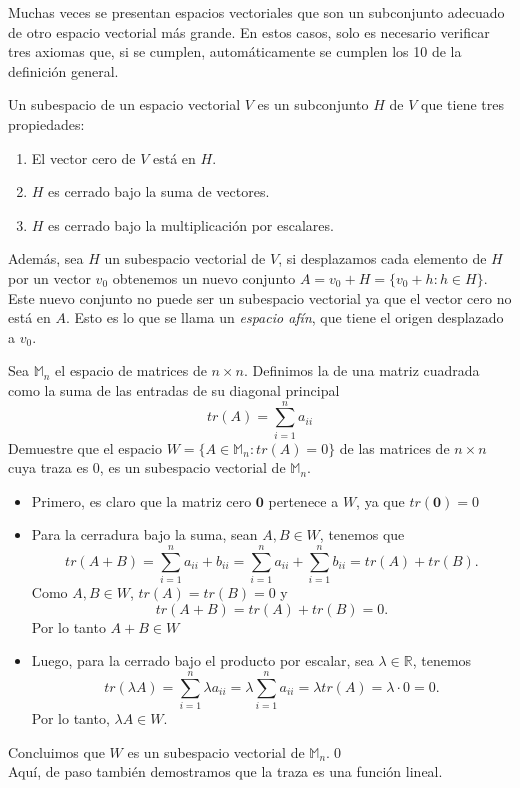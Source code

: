 \documentclass[12pt]{book}
\begin{document}
Muchas veces se presentan espacios vectoriales que son un subconjunto adecuado de otro espacio vectorial más grande. En estos casos, solo es necesario verificar tres axiomas que, si se cumplen, automáticamente se cumplen los 10 de la definición general.
\begin{definitionenv}
    Un subespacio de un espacio vectorial $V$ es un subconjunto $H$ de $V$ que tiene tres propiedades:
    \begin{enumerate}[label=\alph*)]
        \item El vector cero de $V$ está en $H$.
        \item $H$ es cerrado bajo la suma de vectores.
        \item $H$ es cerrado bajo la multiplicación por escalares.
    \end{enumerate}
\end{definitionenv}

Además, sea $H$ un subespacio vectorial de $V$, si desplazamos cada elemento de $H$ por un vector $v_0$ obtenemos un nuevo conjunto $A=v_0+H=\{v_0+h:h\in H\}$. Este nuevo conjunto no puede ser un subespacio vectorial ya que el vector cero no está en $A$. Esto es lo que se llama un \textit{espacio afín}, que tiene el origen desplazado a $v_0$.

\begin{exampleenv}
    Sea $\mathbb{M}_n$ el espacio de matrices de $n\times n$. Definimos la  de una matriz cuadrada como la suma de las entradas de su diagonal principal
    \[
    tr(A)=\sum_{i=1}^n a_{ii}
    \]
    Demuestre que el espacio $W=\{A\in \mathbb{M}_n: tr(A)=0\}$ de las matrices de $n\times n$ cuya traza es 0, es un subespacio vectorial de $\mathbb{M}_n$.

    \begin{itemize}
        \item Primero, es claro que la matriz cero $\mathbf{0}$ pertenece a $W$, ya que $tr(\mathbf{0})=0$
        \item Para la cerradura bajo la suma, sean $A,B\in W$, tenemos que
            \[
                tr(A+B)=\sum_{i=1}^n a_{ii}+b_{ii}=\sum_{i=1}^na_{ii}+\sum_{i=1}^nb_{ii}=tr(A)+tr(B).
            \]
            Como $A,B\in W$, $tr(A)=tr(B)=0$ y 
            \[
                tr(A+B)=tr(A)+tr(B)=0.
            \]
            Por lo tanto $A+B\in W$\\
        \item Luego, para la cerrado bajo el producto por escalar, sea $\lambda\in\mathbb{R}$, tenemos
            \[
            tr(\lambda A)=\sum_{i=1}^n \lambda a_{ii}=\lambda\sum_{i=1}^n a_{ii}=\lambda tr(A)=\lambda\cdot 0=0.
            \]
            Por lo tanto, $\lambda A\in W$.
    \end{itemize}
Concluimos que $W$ es un subespacio vectorial de $\mathbb{M}_n$.\qed\\
    Aquí, de paso también demostramos que la traza es una función lineal.
\end{exampleenv}
\end{document}
